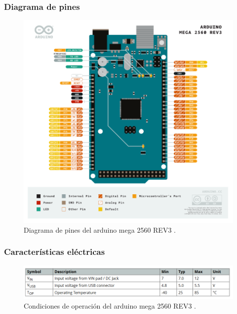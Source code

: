 \subsubsection{Diagrama de pines}
\begin{figure}[H]
    \centering
    \includegraphics[width=.6\linewidth]{Img/k2.png}
    \caption{ Diagrama de pines del arduino mega 2560 REV3 \cite{ArduinoMega}.}
\end{figure}

\subsubsection{Características eléctricas}
\begin{figure}[H]
    \centering
    \includegraphics[width=.6\linewidth]{Img/k3.png}
    \caption{ Condiciones de operación del arduino mega 2560 REV3 \cite{ArduinoMega}.}
\end{figure}

